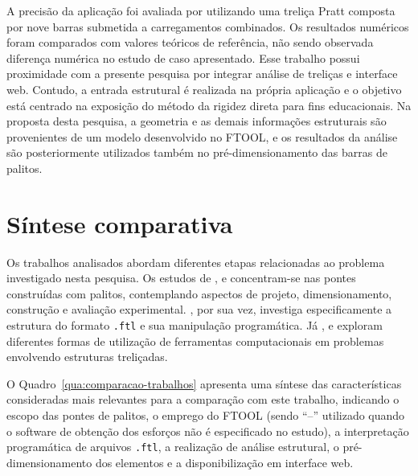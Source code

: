 A precisão da aplicação foi avaliada por  utilizando uma treliça Pratt composta por nove barras submetida a carregamentos combinados. Os resultados numéricos foram comparados com valores teóricos de referência, não sendo observada diferença numérica no estudo de caso apresentado. Esse trabalho possui proximidade com a presente pesquisa por integrar análise de treliças e interface web. Contudo, a entrada estrutural é realizada na própria aplicação e o objetivo está centrado na exposição do método da rigidez direta para fins educacionais. Na proposta desta pesquisa, a geometria e as demais informações estruturais são provenientes de um modelo desenvolvido no \acrshort{FTOOL}, e os resultados da análise são posteriormente utilizados também no pré-dimensionamento das barras de palitos.

\section{Síntese comparativa}
\label{sec:sintese-trabalhos-relacionados}

Os trabalhos analisados abordam diferentes etapas relacionadas ao problema investigado nesta pesquisa. Os estudos de ,  e  concentram-se nas pontes construídas com palitos, contemplando aspectos de projeto, dimensionamento, construção e avaliação experimental. , por sua vez, investiga especificamente a estrutura do formato \texttt{.ftl} e sua manipulação programática. Já ,  e  exploram diferentes formas de utilização de ferramentas computacionais em problemas envolvendo estruturas treliçadas.

O Quadro~\ref{qua:comparacao-trabalhos} apresenta uma síntese das características consideradas mais relevantes para a comparação com este trabalho, indicando o escopo das pontes de palitos, o emprego do \acrshort{FTOOL} (sendo ``--'' utilizado quando o software de obtenção dos esforços não é especificado no estudo), a interpretação programática de arquivos \texttt{.ftl}, a realização de análise estrutural, o pré-dimensionamento dos elementos e a disponibilização em interface web.

